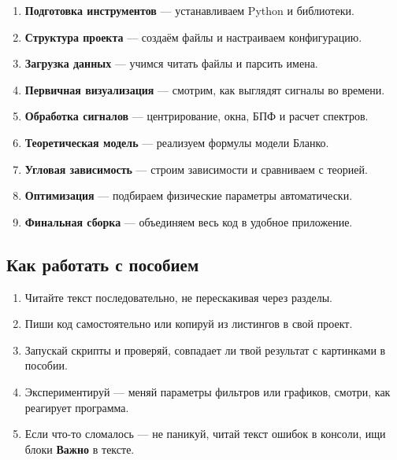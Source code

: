 \begin{enumerate}
	\item \textbf{Подготовка инструментов} — устанавливаем Python и библиотеки.
	\item \textbf{Структура проекта} — создаём файлы и настраиваем конфигурацию.
	\item \textbf{Загрузка данных} — учимся читать файлы и парсить имена.
	\item \textbf{Первичная визуализация} — смотрим, как выглядят сигналы во времени.
	\item \textbf{Обработка сигналов} — центрирование, окна, БПФ и расчет спектров.
	\item \textbf{Теоретическая модель} — реализуем формулы модели Бланко.
	\item \textbf{Угловая зависимость} — строим зависимости и сравниваем с теорией.
	\item \textbf{Оптимизация} — подбираем физические параметры автоматически.
	\item \textbf{Финальная сборка} — объединяем весь код в удобное приложение.
\end{enumerate}

\subsection*{Как работать с пособием}


\begin{enumerate}
	\item Читайте текст последовательно, не перескакивая через разделы.
	\item Пиши код самостоятельно или копируй из листингов в свой проект.
	\item Запускай скрипты и проверяй, совпадает ли твой результат с картинками в пособии.
	\item Экспериментируй — меняй параметры фильтров или графиков, смотри, как реагирует программа.
	\item Если что-то сломалось — не паникуй, читай текст ошибок в консоли, ищи блоки \textbf{Важно} в тексте.
\end{enumerate}

